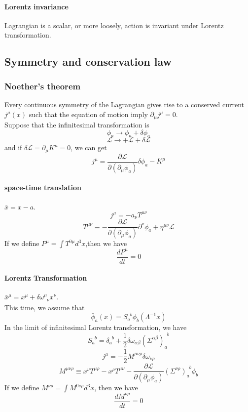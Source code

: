 \documentclass{article}
\begin{document}
\paragraph{Lorentz invariance} Lagrangian is a scalar, or more loosely, action is invariant under Lorentz transformation.

\subsection{Symmetry and conservation law}
\subsubsection{Noether's theorem}
Every continuous symmetry of the Lagrangian gives rise to a conserved current $j^{\mu}(x)$ such that the equation of motion imply $\partial_{\mu} j^{\mu} = 0$.\\
Suppose that the infinitesimal transformation is
\[\phi_a \rightarrow \phi_a + \delta \phi_a\]
\[\mathcal{L} \rightarrow + \mathcal{L} + \delta \mathcal{L} \]
and if $\delta \mathcal{L} = \partial_{\mu} K^{\mu} = 0$, we can get
\[j^{\mu} = \frac{\partial \mathcal{L}}{\partial (\partial_{\mu} \phi_a)} \delta \phi_a - K^{\mu}\]

\paragraph{space-time translation} $\bar{x} = x - a$.
\[j^{\mu} = -a_{\nu} T^{\mu \nu}\]
\[T^{\mu \nu} \equiv -\frac{\partial \mathcal{L}}{\partial(\partial_{\mu}\phi_a)} \partial^{\nu} \phi_a + \eta^{\mu \nu} \mathcal{L}\]
If we define $P^{\mu} = \int T^{0 \mu} d^3 x$,then we have
\[\frac{d P^{\mu}}{dt} = 0\]

\paragraph{Lorentz Transformation} $\bar{x}^{\mu} = x^{\mu} + \delta \omega^{\mu}_{\phantom{\mu}\nu} x^{\nu}$.\\
This time, we assume that
\[\bar{\phi}_a(x) = S_{a}^{\phantom{a}b}\phi_b(\Lambda^{-1}x)\]
In the limit of infinitesimal Lorentz transformation, we have
\[S_{a}^{\phantom{a}b} = \delta_{a}^{\phantom{a}b}+\frac{1}{2} \delta \omega_{\alpha \beta} (\Sigma^{\alpha \beta})_{a}^{\phantom{a}b} \]
\[j^{\mu} = -\frac{1}{2} M^{\mu \nu \rho}  \delta \omega_{\nu \rho}\]
\[M^{\mu \nu \rho} \equiv x^{\nu}T^{\mu \rho} - x^{\rho} T^{\mu \nu} - \frac{\partial \mathcal{L}}{\partial (\partial_{\mu}\phi_a)}(\Sigma^{\nu \rho})_{a}^{\phantom{a}b}\phi_b\]
If we define $M^{\nu \rho} = \int M^{0 \nu \rho} d^3 x$, then we have
\[\frac{dM^{\nu \rho}}{dt} = 0\]
\end{document}
